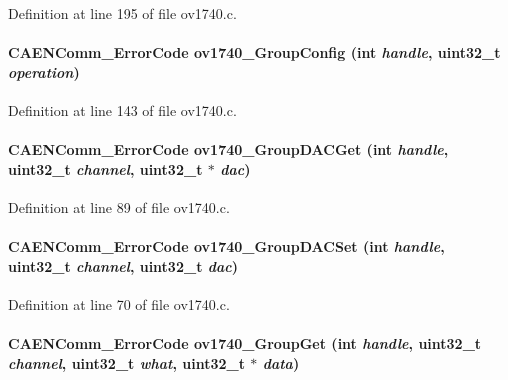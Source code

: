 Definition at line 195 of file ov1740.c.
\paragraph[{ov1740\_\-GroupConfig}]{\setlength{\rightskip}{0pt plus 5cm}CAENComm\_\-ErrorCode ov1740\_\-GroupConfig (int {\em handle}, \/  uint32\_\-t {\em operation})}\hfill\label{ov1740drv_8h_aba13dbef693106001aa52528e3ee33cd}


Definition at line 143 of file ov1740.c.
\paragraph[{ov1740\_\-GroupDACGet}]{\setlength{\rightskip}{0pt plus 5cm}CAENComm\_\-ErrorCode ov1740\_\-GroupDACGet (int {\em handle}, \/  uint32\_\-t {\em channel}, \/  uint32\_\-t $\ast$ {\em dac})}\hfill\label{ov1740drv_8h_a72d507dc22b139983064f68ec4154aae}


Definition at line 89 of file ov1740.c.
\paragraph[{ov1740\_\-GroupDACSet}]{\setlength{\rightskip}{0pt plus 5cm}CAENComm\_\-ErrorCode ov1740\_\-GroupDACSet (int {\em handle}, \/  uint32\_\-t {\em channel}, \/  uint32\_\-t {\em dac})}\hfill\label{ov1740drv_8h_a8d990b4f92dc4c11d27f7681f53b8098}


Definition at line 70 of file ov1740.c.
\paragraph[{ov1740\_\-GroupGet}]{\setlength{\rightskip}{0pt plus 5cm}CAENComm\_\-ErrorCode ov1740\_\-GroupGet (int {\em handle}, \/  uint32\_\-t {\em channel}, \/  uint32\_\-t {\em what}, \/  uint32\_\-t $\ast$ {\em data})}\hfill\label{ov1740drv_8h_a080182f74c40dcfacb086f2906ebd977}


